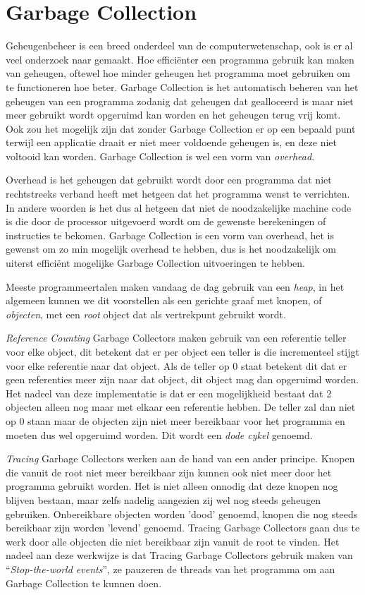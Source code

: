 \section{Garbage Collection}
\label{sec:Garbage collection}
Geheugenbeheer is een breed onderdeel van de computerwetenschap, ook is er al veel onderzoek naar gemaakt.
Hoe efficiënter een programma gebruik kan maken van geheugen, oftewel hoe minder geheugen het programma moet gebruiken om te functioneren hoe beter.
Garbage Collection is het automatisch beheren van het geheugen van een programma zodanig dat geheugen dat gealloceerd is maar niet meer gebruikt wordt opgeruimd kan worden en het geheugen terug vrij komt.
Ook zou het mogelijk zijn dat zonder Garbage Collection er op een bepaald punt terwijl een applicatie draait er niet meer voldoende geheugen is, en deze niet voltooid kan worden.
Garbage Collection is wel een vorm van \textit{overhead}.


Overhead is het geheugen dat gebruikt wordt door een programma dat niet rechtstreeks verband heeft met hetgeen dat het programma wenst te verrichten.
In andere woorden is het dus al hetgeen dat niet de noodzakelijke machine code is die door de processor uitgevoerd wordt om de gewenste berekeningen of instructies te bekomen.
Garbage Collection is een vorm van overhead, het is gewenst om zo min mogelijk overhead te hebben, dus is het noodzakelijk om uiterst efficiënt mogelijke Garbage Collection uitvoeringen te hebben.


Meeste programmeertalen maken vandaag de dag gebruik van een \textit{heap}, in het algemeen kunnen we dit voorstellen als een gerichte graaf met knopen, of \textit{objecten}, met een \textit{root} object dat als vertrekpunt gebruikt wordt.


\textit{Reference Counting} Garbage Collectors maken gebruik van een referentie teller voor elke object, dit betekent dat er per object een teller is die incrementeel stijgt voor elke referentie naar dat object.
Als de teller op 0 staat betekent dit dat er geen referenties meer zijn naar dat object, dit object mag dan  opgeruimd worden.
Het nadeel van deze implementatie is dat er een mogelijkheid bestaat dat 2 objecten alleen nog maar met elkaar een referentie hebben.
De teller zal dan niet op 0 staan maar de objecten zijn niet meer bereikbaar voor het programma en moeten dus wel opgeruimd worden.
Dit wordt een \textit{dode cykel} genoemd.\autocite{VanderCruysse2019}

\textit{Tracing} Garbage Collectors werken aan de hand van een ander principe.
Knopen die vanuit de root niet meer bereikbaar zijn kunnen ook niet meer door het programma gebruikt worden.
Het is niet alleen onnodig dat deze knopen nog blijven bestaan, maar zelfs nadelig aangezien zij wel nog steeds geheugen gebruiken.
Onbereikbare objecten worden 'dood' genoemd, knopen die nog steeds bereikbaar zijn worden 'levend' genoemd.
Tracing Garbage Collectors gaan dus te werk door alle objecten die niet bereikbaar zijn vanuit de root te vinden. 
Het nadeel aan deze werkwijze is dat Tracing Garbage Collectors gebruik maken van ``\textit{Stop-the-world events}'', ze pauzeren de threads van het programma om aan Garbage Collection te kunnen doen.

